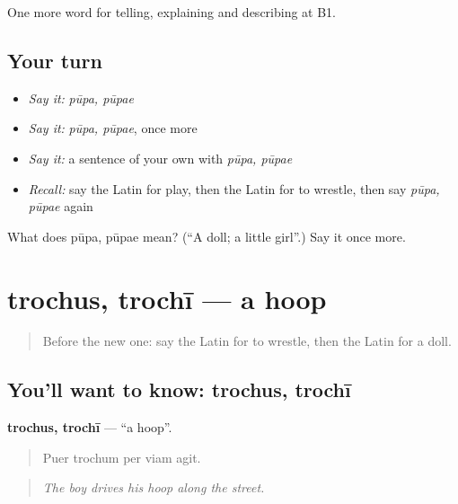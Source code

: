 \begin{grammarlens}[title={What you've built}]
One more word for telling, explaining and describing at B1.
\end{grammarlens}

\subsection*{Your turn}
\begin{itemize}
\raggedright
  \item \emph{Say it:} \emph{pūpa, pūpae}
  \item \emph{Say it:} \emph{pūpa, pūpae}, once more
  \item \emph{Say it:} a sentence of your own with \emph{pūpa, pūpae}
  \item \emph{Recall:} say the Latin for play, then the Latin for to wrestle, then say \emph{pūpa, pūpae} again
\end{itemize}

\begin{tcolorbox}[breakable,colback=teal!4,colframe=teal!35!black,title={Before you move on}]
What does pūpa, pūpae mean? (\textquotedblleft{}A doll; a little girl\textquotedblright{}.) Say it once more.
\end{tcolorbox}
\section[trochus, trochī]{trochus, trochī — a hoop}

\label{lesson:LA-C540-trochus}



\begin{quote}
Before the new one: say the Latin for to wrestle, then the Latin for a doll.
\end{quote}

\subsection*{You'll want to know: trochus, trochī}
\textbf{trochus, trochī} — \textquotedblleft{}a hoop\textquotedblright{}.

\begin{quote}
Puer trochum per viam agit.
\end{quote}

\begin{quote}
\emph{The boy drives his hoop along the street.}
\end{quote}

